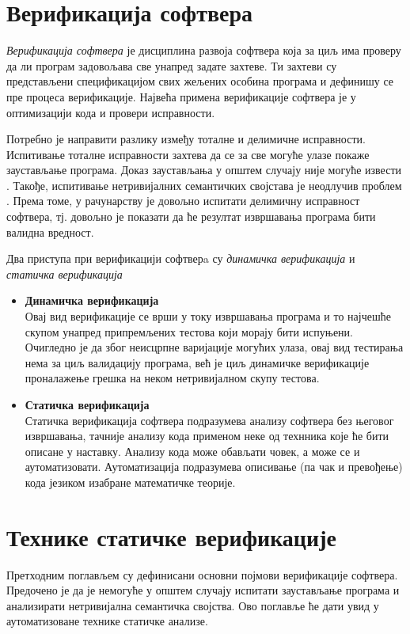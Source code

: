 \documentclass[a4paper]{article}
\begin{document}
{\section{Верификација софтвера}

\emph{Верификација софтвера} је дисциплина развоја софтвера која за циљ има проверу да ли програм задовољава све унапред задате захтеве. Ти захтеви су представљени спецификацијом свих жељених особина програма и дефинишу се пре процеса верификације. Највећа примена верификације софтвера је у оптимизацији кода и провери исправности.


Потребно је направити разлику између тоталне и делимичне исправности. Испитивање тоталне исправности захтева да се за све могуће улазе покаже заустављање програма. Доказ заустављања у општем случају није могуће извести \cite{turing}. Такође, испитивање нетривијалних семантичких својстава је неодлучив проблем \cite{rice}.
Према томе, у рачунарству је довољно испитати делимичну исправност софтвера, тј. довољно је показати да ће резултат извршавања програма бити валидна вредност.


Два приступа при верификацији софтверa су \emph{динамичка верификација} и \emph{статичка верификација} \cite{milena} 
\begin{itemize}
\item \textbf{Динамичка верификација}\\
Овај вид верификације се врши у току извршавања програма и то најчешће скупом 
унапред припремљених тестова који морају бити испуњени. Очигледно је да због неисцрпне варијације могућих улаза, овај вид тестирања нема за циљ валидацију програма, већ је циљ динамичке верификације проналажење грешка на неком нетривијалном скупу тестова.
\item \textbf{Статичка верификација}\\
Статичка верификација софтвера подразумева анализу софтвера без његовог извршавања, тачније анализу кода применом неке од технника које ће бити описане у наставку. Анализу кода може обављати човек, а може се и аутоматизовати. Аутоматизација подразумева описивање (па чак и превођење) кода језиком изабране математичке теорије.
\end{itemize}


\section{Технике статичке верификације}
Претходним поглављем су дефинисани основни појмови верификације софтвера. Предочено је да је немогуће у општем случају испитати заустављање програма и анализирати нетривијална семантичка својства. Ово поглавље ће дати увид у аутоматизоване технике статичке анализе.

}
\end{document}
